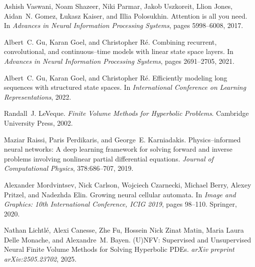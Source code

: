\documentclass[10pt]{article}
\begin{document}

\begin{thebibliography}{10}

Ashish Vaswani, Noam Shazeer, Niki Parmar, Jakob Uszkoreit, Llion Jones,
Aidan~N. Gomez, \L{}ukasz Kaiser, and Illia Polosukhin.
\newblock Attention is all you need.
\newblock In \emph{Advances in Neural Information Processing Systems}, pages
  5998--6008, 2017.

Albert~C. Gu, Karan Goel, and Christopher R{\'e}.
\newblock Combining recurrent, convolutional, and continuous--time models with
  linear state space layers.
\newblock In \emph{Advances in Neural Information Processing Systems}, pages
  2691--2705, 2021.

Albert~C. Gu, Karan Goel, and Christopher R{\'e}.
\newblock Efficiently modeling long sequences with structured state spaces.
\newblock In \emph{International Conference on Learning Representations}, 2022.

Randall~J. LeVeque.
\newblock \emph{Finite Volume Methods for Hyperbolic Problems}.
\newblock Cambridge University Press, 2002.

Maziar Raissi, Paris Perdikaris, and George~E. Karniadakis.
\newblock Physics--informed neural networks: A deep learning framework for
  solving forward and inverse problems involving nonlinear partial
  differential equations.
\newblock \emph{Journal of Computational Physics}, 378:686--707, 2019.

Alexander Mordvintsev, Nick Carlson, Wojciech Czarnecki, Michael Berry,
  Alexey Pritzel, and Nadezhda Elin.
\newblock Growing neural cellular automata.
\newblock In \emph{Image and Graphics: 10th International Conference, ICIG
  2019}, pages 98--110. Springer, 2020.

Nathan Lichtlé, Alexi Canesse, Zhe Fu, Hossein Nick Zinat Matin, Maria Laura
Delle Monache, and Alexandre~M. Bayen.
\newblock (U)NFV: Supervised and Unsupervised Neural Finite Volume Methods for
Solving Hyperbolic {PDE}s.
\newblock \emph{arXiv preprint arXiv:2505.23702}, 2025.

\end{thebibliography}
\end{document}
